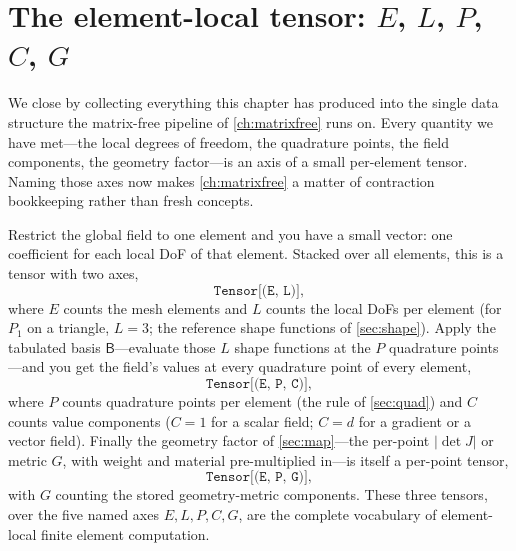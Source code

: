 \section{The element-local tensor: $E$, $L$, $P$, $C$, $G$}
\label{sec:tensor}

We close by collecting everything this chapter has produced into the single data
structure the matrix-free pipeline of \cref{ch:matrixfree} runs on. Every quantity
we have met---the local degrees of freedom, the quadrature points, the field
components, the geometry factor---is an axis of a small per-element tensor. Naming
those axes now makes \cref{ch:matrixfree} a matter of contraction bookkeeping rather
than fresh concepts.

Restrict the global field to one element and you have a small vector: one coefficient
for each local DoF of that element. Stacked over all elements, this is a tensor with
two axes,
\[
  \texttt{Tensor[(E, L)]},
\]
where $E$ counts the mesh elements and $L$ counts the local DoFs per element (for
$P_1$ on a triangle, $L=3$; the reference shape functions of \cref{sec:shape}).
Apply the tabulated basis $\mathsf{B}$---evaluate those $L$ shape functions at the
$P$ quadrature points---and you get the field's values at every quadrature point of
every element,
\[
  \texttt{Tensor[(E, P, C)]},
\]
where $P$ counts quadrature points per element (the rule of \cref{sec:quad}) and $C$
counts value components ($C=1$ for a scalar field; $C=d$ for a gradient or a vector
field). Finally the geometry factor of \cref{sec:map}---the per-point $|\det J|$ or
metric $G$, with weight and material pre-multiplied in---is itself a per-point tensor,
\[
  \texttt{Tensor[(E, P, G)]},
\]
with $G$ counting the stored geometry-metric components. These three tensors, over the
five named axes $E,L,P,C,G$, are the complete vocabulary of element-local finite
element computation.

